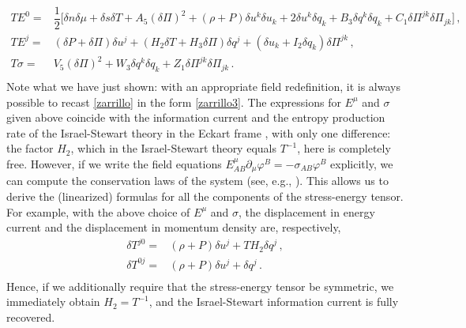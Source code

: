 \documentclass[a4paper, amsfonts, amssymb, amsmath, reprint, showkeys, nofootinbib, twoside, onecolumn,notitlepage]{revtex4-1}
\begin{document}
\begin{equation}\label{zarrillo3}
\begin{split}
TE^0={}& \dfrac{1}{2} \bigg[\delta n \delta \mu + \delta s \delta T +A_5 (\delta \Pi)^2  + (\rho{+}P) \delta u^k \delta u_k + 2 \delta u^k \delta q_k + B_3 \delta q^k \delta q_k + C_1 \delta \Pi^{jk} \delta \Pi_{jk} \bigg] \, ,  \\
TE^j={}& (\delta P+ \delta \Pi)\delta u^j +(H_2 \delta T +H_3 \delta \Pi)\delta q^j + ( \delta u_k +I_2 \delta q_k)\delta \Pi^{jk} \, ,  \\
T\sigma ={}&  V_5 (\delta \Pi)^2 +
   W_3 \delta q^k \delta q_k + Z_1 \delta \Pi^{jk} \delta \Pi_{jk}  \, . \\
\end{split}
\end{equation}
Note what we have just shown: with an appropriate field redefinition, it is always possible to recast \eqref{zarrillo} in the form \eqref{zarrillo3}. The expressions for $E^\mu$ and $\sigma$ given above coincide with the information current and the entropy production rate of the Israel-Stewart theory in the Eckart frame \cite{Hishcock1983}, with only one difference: the factor $H_2$, which in the Israel-Stewart theory equals $T^{-1}$, here is completely free. However, if we write the field equations $E^\mu_{AB}\partial_\mu \varphi^B=-\sigma_{AB}\varphi^B$ explicitly, we can compute the conservation laws of the system (see, e.g., \cite{GavassinoNonHydro2022}). This allows us to derive the (linearized) formulas for all the components of the stress-energy tensor. For example, with the above choice of $E^\mu$ and $\sigma$, the displacement in energy current and the displacement in momentum density \cite{MTW_book} are, respectively,
\begin{equation}
    \begin{split}
        \delta T^{j0} ={}& (\rho+P)\delta u^j +TH_2\delta q^j \, , \\
        \delta T^{0j} ={}& (\rho+P)\delta u^j +\delta q^j \, . \\
    \end{split}
\end{equation}
Hence, if we additionally require that the stress-energy tensor be symmetric, we immediately obtain $H_2=T^{-1}$, and the Israel-Stewart information current is fully recovered.
\end{document}
